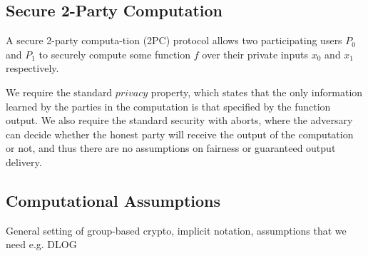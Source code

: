 \subsection{Secure 2-Party Computation}
A secure 2-party computa-tion (2PC) protocol allows two participating users $P_0$ and $P_1$ to securely compute some function $f$ over their private inputs $x_0$ and $x_1$ respectively.

We require the standard $privacy$ property, which states that the only information learned by the parties in the computation is that specified by the function output.
We also require the standard security with aborts, where the adversary can decide whether the honest party will receive the output of the computation or not, and thus there are no assumptions on fairness or guaranteed output delivery.

\subsection{Computational Assumptions}

\begin{todobox}
    General setting of group-based crypto, implicit notation, assumptions that we need e.g. DLOG 
\end{todobox}
